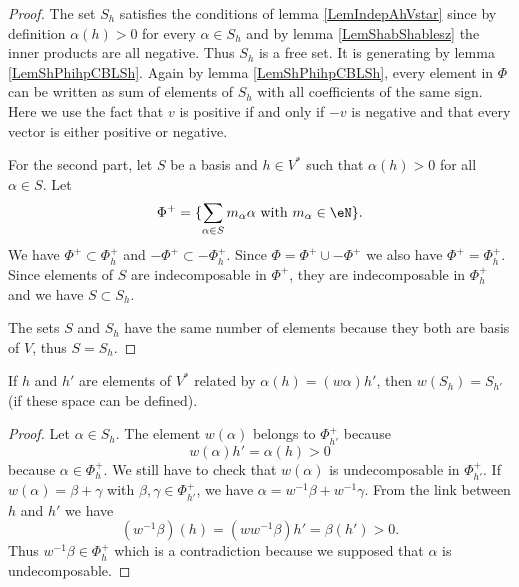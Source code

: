 \begin{proof}
    The set \( S_h\) satisfies the conditions of lemma \ref{LemIndepAhVstar} since by definition \( \alpha(h)>0\) for every \( \alpha\in S_h\) and by lemma \ref{LemShabShablesz} the inner products are all negative. Thus \( S_h\) is a free set. It is generating by lemma \ref{LemShPhihpCBLSh}. Again by lemma \ref{LemShPhihpCBLSh}, every element in \( \Phi\) can be written as sum of elements of \( S_h\) with all coefficients of the same sign. Here we use the fact that \( v\) is positive if and only if \( -v\) is negative and that every vector is either positive or negative.

    For the second part, let \( S\) be a basis and \( h\in V^*\) such that \( \alpha(h)>0\) for all \( \alpha\in S\). Let
    \begin{equation}
        \Phi^+=\{ \sum_{\alpha\in S}m_{\alpha}\alpha \text{ with } m_{\alpha}\in\eN \}.
    \end{equation}
    We have \( \Phi^+\subset\Phi_h^+\) and \( -\Phi^+\subset -\Phi_h^+\). Since \( \Phi=\Phi^+\cup-\Phi^+\) we also have \( \Phi^+=\Phi_h^+\). Since elements of \( S\) are indecomposable in \( \Phi^+\), they are indecomposable in \( \Phi^+_h\) and we have \( S\subset S_h\).

    The sets \( S\) and \( S_h\) have the same number of elements because they both are basis of \( V\), thus \( S=S_h\).
\end{proof}

\begin{lemma}\label{LemwShShpahwahp}
    If \( h\) and \( h'\) are elements of \( V^*\) related by \( \alpha(h)=(w\alpha)h'\), then \( w(S_h)=S_{h'}\) (if these space can be defined).
\end{lemma}

\begin{proof}
    Let \( \alpha\in S_h\). The element \( w(\alpha)\) belongs to \( \Phi_{h'}^+\) because
    \begin{equation}
        w(\alpha)h'=\alpha(h)>0
    \end{equation}
    because \( \alpha\in\Phi_h^+\). We still have to check that \( w(\alpha)\) is undecomposable in \( \Phi_{h'}^+\). If \( w(\alpha)=\beta+\gamma\) with \( \beta,\gamma\in\Phi_{h'}^+\), we have \( \alpha=w^{-1}\beta+w^{-1}\gamma\). From the link between \( h\) and \( h'\) we have
    \begin{equation}
        (w^{-1}\beta)(h)=(ww^{-1}\beta)h'=\beta(h')>0.
    \end{equation}
    Thus \( w^{-1}\beta\in \Phi_h^+\) which is a contradiction because we supposed that \( \alpha\) is undecomposable.
\end{proof}

